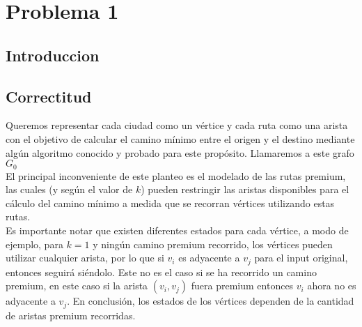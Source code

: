 
\section{Problema 1}


\subsection{Introduccion}
\subsection{Correctitud}
Queremos representar cada ciudad como un vértice y cada ruta como una arista con el objetivo de calcular el camino mínimo entre el origen y el destino mediante algún algoritmo conocido y probado para este propósito. Llamaremos a este grafo $G_0$\\

El principal inconveniente de este planteo es el modelado de las rutas premium, las cuales (y según el valor de $k$) pueden restringir las aristas disponibles para el cálculo del camino mínimo a medida que se recorran vértices utilizando estas rutas.\\

Es importante notar que existen diferentes estados para cada vértice, a modo de ejemplo, para $k=1$ y ningún camino premium recorrido, los vértices pueden utilizar cualquier arista, por lo que si $v_i$ es adyacente a $v_j$ para el input original, entonces seguirá siéndolo. Este no es el caso si se ha recorrido un camino premium, en este caso si la arista $(v_i, v_j)$ fuera premium entonces $v_i$ ahora no es adyacente a $v_j$. En conclusión, los estados de los vértices dependen de la cantidad de aristas premium recorridas.\\

